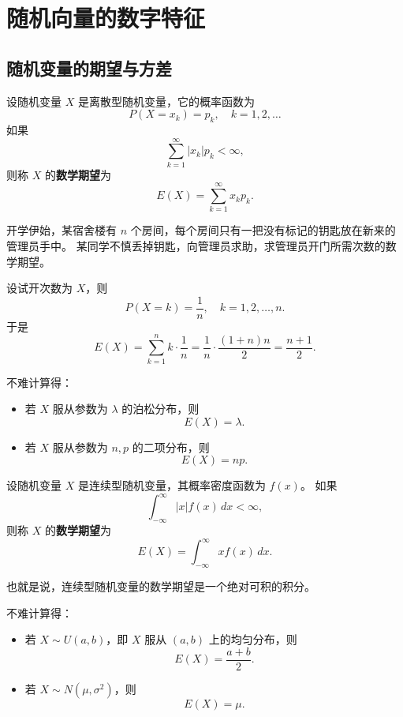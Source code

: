 \chapter{随机向量的数字特征}
\section{随机变量的期望与方差}
\begin{definition}[离散型随机变量的数学期望]
设随机变量 \(X\) 是离散型随机变量，它的概率函数为
\[
P(X=x_k)=p_k, \quad k=1,2,\ldots
\]
如果
\[
\sum_{k=1}^{\infty} |x_k|p_k < \infty,
\]
则称 \(X\) 的\textbf{数学期望}为
\[
E(X)=\sum_{k=1}^{\infty} x_k p_k.
\]
\end{definition}
\begin{example}
开学伊始，某宿舍楼有 $n$ 个房间，每个房间只有一把没有标记的钥匙放在新来的管理员手中。  
某同学不慎丢掉钥匙，向管理员求助，求管理员开门所需次数的数学期望。

\begin{solution}
设试开次数为 $X$，则  
\[
P(X=k)=\frac{1}{n}, \quad k=1,2,\ldots,n.
\]
于是
\[
E(X)
=\sum_{k=1}^{n} k \cdot \frac{1}{n}
=\frac{1}{n}\cdot \frac{(1+n)n}{2}
=\frac{n+1}{2}.
\]
\end{solution}
\end{example}
\begin{note}
不难计算得：

\begin{itemize}
  \item 若 \(X\) 服从参数为 \(\lambda\) 的泊松分布，则
  \[
  E(X)=\lambda.
  \]

  \item 若 \(X\) 服从参数为 \(n,p\) 的二项分布，则
  \[
  E(X)=np.
  \]
\end{itemize}
\end{note}
\begin{definition}
设随机变量 \(X\) 是连续型随机变量，其概率密度函数为 \(f(x)\)。  
如果
\[
\int_{-\infty}^{\infty} |x| f(x)\,dx < \infty,
\]
则称 \(X\) 的\textbf{数学期望}为
\[
E(X)=\int_{-\infty}^{\infty} x f(x)\,dx.
\]

也就是说，连续型随机变量的数学期望是一个绝对可积的积分。
\end{definition}
\begin{note}
不难计算得：

\begin{itemize}
  \item 若 \(X \sim U(a,b)\)，即 \(X\) 服从 \((a,b)\) 上的均匀分布，则
  \[
  E(X)=\frac{a+b}{2}.
  \]

  \item 若 \(X \sim N(\mu,\sigma^2)\)，则
  \[
  E(X)=\mu.
  \]
\end{itemize}
\end{note}
